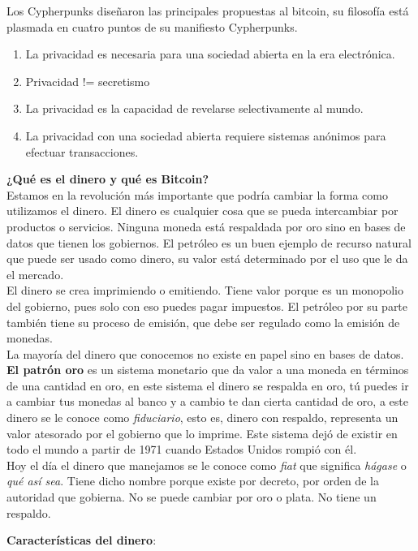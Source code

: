 \documentclass[a4paper,12pt]{lib/pub}
\begin{document}
Los Cypherpunks diseñaron las principales propuestas al bitcoin, su filosofía está plasmada en cuatro puntos de su manifiesto Cypherpunks.
\begin{enumerate}	
	\item  La privacidad es necesaria para una sociedad abierta en la era electrónica.
	\item  Privacidad != secretismo
	\item  La privacidad es la capacidad de revelarse selectivamente al mundo.
	\item  La privacidad con una sociedad abierta requiere sistemas anónimos para efectuar transacciones.
\end{enumerate}
\textbf{¿Qué es el dinero y qué es Bitcoin?}\\
Estamos en la revolución más importante que podría cambiar la forma como utilizamos el dinero.
El dinero es cualquier cosa que se pueda intercambiar por productos o servicios. Ninguna moneda está respaldada por oro sino en bases de datos que tienen los gobiernos. El petróleo es un buen ejemplo de recurso natural que puede ser usado como dinero, su valor está determinado por el uso que le da el mercado.\\
El dinero se crea imprimiendo o emitiendo. Tiene valor porque es un monopolio del gobierno, pues solo con eso puedes pagar impuestos. El petróleo por su parte también tiene su proceso de emisión, que debe ser regulado como la emisión de monedas.\\
La mayoría del dinero que conocemos no existe en papel sino en bases de datos.\\

\textbf{El patrón oro} es un sistema monetario que da valor a una moneda en términos de una cantidad en oro, en este sistema el dinero se respalda en oro, tú puedes ir a cambiar tus monedas al banco y a cambio te dan cierta cantidad de oro, a este dinero se le conoce como \textit{fiduciario}, esto es, dinero con respaldo, representa un valor atesorado por el gobierno que lo imprime. Este sistema dejó de existir en todo el mundo a partir de 1971 cuando Estados Unidos rompió con él.\\

Hoy el día el dinero que manejamos se le conoce como \textit{fiat} que significa \textit{hágase} o \textit{qué así sea}. Tiene dicho nombre porque existe por decreto, por orden de la autoridad que gobierna. No se puede cambiar por oro o plata. No tiene un respaldo.

\textbf{Características del dinero}:
\end{document}
